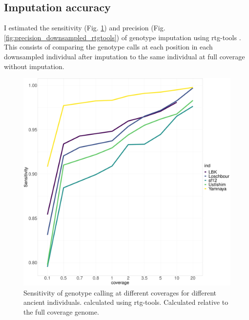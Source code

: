 \subsection{Imputation accuracy}

I estimated the sensitivity (Fig. \ref{fig:Sensitivity_downsampled_rtgtools}) and precision (Fig.  \ref{fig:precision_downsampled_rtgtools}) of genotype imputation using rtg-tools \cite{cleary2014joint}. This consists of comparing the genotype calls at each position in each downsampled individual after imputation to the same individual at full coverage without imputation.

\begin{figure}[htp]
    \centering
    \includegraphics[width=1.0\textwidth]{../images/chapter1/allDownsampled_rtgtools_sensitivity.pdf}
    \caption{Sensitivity of genotype calling at different coverages for different ancient individuals.  calculated using rtg-tools. Calculated relative to the full coverage genome.}
    \label{fig:Sensitivity_downsampled_rtgtools}
\end{figure}

